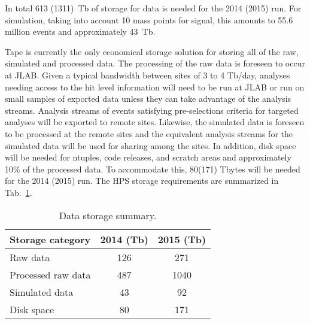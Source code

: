 In total 613 (1311)~Tb of storage for data is needed for the 2014 (2015) run. For simulation, taking 
into account 10 mass points for signal, this amounts to 55.6 million events and approximately 43~Tb.

Tape is currently the only economical storage
solution for storing all of the raw, simulated and processed data.
The processing of the raw data is foreseen to occur at JLAB. Given a
typical bandwidth between sites of 3 to 4 Tb/day, analyses needing
access to the hit level information will need to be run at JLAB or run
on small samples of exported data unless they can take advantage of the
analysis streams. Analysis streams of events satisfying
pre-selections criteria for targeted analyses will be exported to remote
sites. Likewise, the simulated data is foreseen to be processed at the
remote sites and the equivalent analysis streams for the simulated data
will be used for sharing among the sites. In addition, disk space will be 
needed for ntuples, code releases, and scratch areas and approximately 10\% of the 
processed data. To accommodate this, 80(171) Tbytes will be needed for the 2014 (2015) run. 
The HPS storage requirements are summarized in Tab.~\ref{tab:datastorage}.
\begin{table}[tbp]
\centering
\begin{tabular}{|l|c|c|}
\hline
Storage category & 2014 (Tb) & 2015 (Tb) \\
\hline
Raw data & 126 & 271 \\
Processed raw data & 487 & 1040 \\
Simulated data & 43 & 92 \\
Disk space  & 80  & 171 \\
\hline
\end{tabular}
\caption{{\small Data storage summary.}}
\label{tab:datastorage}
\end{table}


